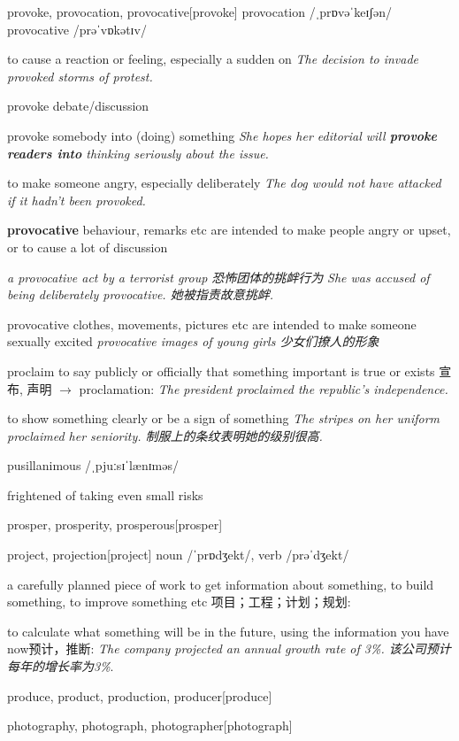 \begin{DefWord}{provoke, provocation, provocative}[provoke]
    provocation /ˌprɒvəˈkeɪʃən/ provocative /prəˈvɒkətɪv/


    to cause a reaction or feeling, especially a sudden on
    \textit{The decision to invade provoked storms of protest.}

    provoke debate/discussion

    provoke somebody into (doing) something
    \textit{She hopes her editorial will \textbf{provoke readers into} thinking seriously about the issue.}

    to make someone angry, especially deliberately
    \textit{The dog would not have attacked if it hadn't been provoked.}

    \textbf{provocative}  behaviour, remarks etc are intended to make people angry or upset, or to cause a lot of discussion

    \textit{a provocative act by a terrorist group 恐怖团体的挑衅行为}
    \textit{She was accused of being deliberately provocative. 她被指责故意挑衅. }

    provocative clothes, movements, pictures etc are intended to make someone sexually excited
    \textit{provocative images of young girls 少女们撩人的形象}
\end{DefWord}

\begin{DefWord}{proclaim}
    to say publicly or officially that something important is true or exists 宣布, 声明 $\rightarrow$ proclamation:
    \textit{The president proclaimed the republic's independence.}

    to show something clearly or be a sign of something
    \textit{The stripes on her uniform proclaimed her seniority. 制服上的条纹表明她的级别很高. }

\end{DefWord}

\begin{DefWord}{pusillanimous}
    /ˌpjuːsɪˈlænɪməs/
    
    frightened of taking even small risks
\end{DefWord}

\begin{DefWord}{prosper, prosperity, prosperous}[prosper]
\end{DefWord}

\begin{DefWord}{project, projection}[project]
    noun  /ˈprɒdʒekt/, verb /prəˈdʒekt/
    
    a carefully planned piece of work to get information about something, to build something, to improve something etc 项目；工程；计划；规划:
    
    to calculate what something will be in the future, using the information you have now预计，推断:
     \textit{The company projected an annual growth rate of 3\%. 该公司预计每年的增长率为3\%}. 
    
 \end{DefWord}
    
 \begin{DefWord}{produce, product, production, producer}[produce]
 \end{DefWord}

 \begin{DefWord}{photography, photograph, photographer}[photograph]
 \end{DefWord}